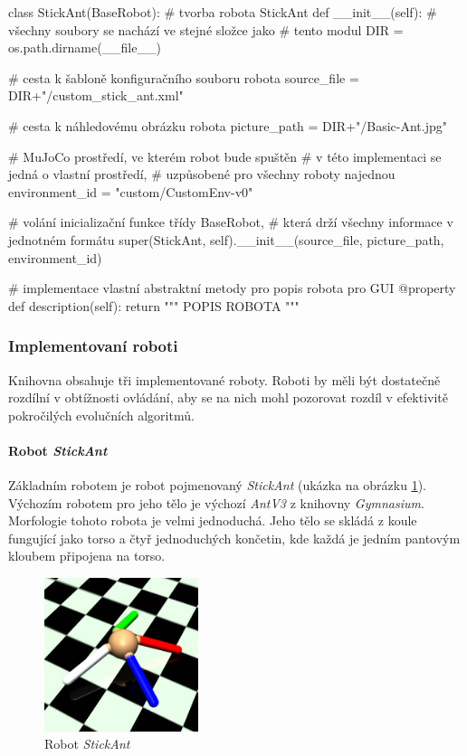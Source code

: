 \begin{code}
class StickAnt(BaseRobot): # tvorba robota StickAnt
    def __init__(self):
        # všechny soubory se nachází ve stejné složce jako 
        # tento modul
        DIR = os.path.dirname(__file__)

        # cesta k šabloně konfiguračního souboru robota
        source_file = DIR+"/custom_stick_ant.xml"

        # cesta k náhledovému obrázku robota
        picture_path = DIR+"/Basic-Ant.jpg"

        # MuJoCo prostředí, ve kterém robot bude spuštěn
        # v této implementaci se jedná o vlastní prostředí,
        # uzpůsobené pro všechny roboty najednou
        environment_id = "custom/CustomEnv-v0"

        # volání inicializační funkce třídy BaseRobot,
        # která drží všechny informace v jednotném formátu
        super(StickAnt, self).__init__(source_file, 
                                       picture_path, 
                                       environment_id)

    # implementace vlastní abstraktní metody pro popis robota pro GUI
    @property
    def description(self):
        return """ POPIS ROBOTA """
\end{code}

\subsubsection{Implementovaní roboti}
Knihovna obsahuje tři implementované roboty. Roboti by měli být dostatečně
rozdílní v obtížnosti ovládání, aby se na nich mohl pozorovat rozdíl v
efektivitě pokročilých evolučních algoritmů.

\paragraph{Robot \emph{StickAnt}} \label{imp:robots.StickAnt}
Základním robotem je robot pojmenovaný \emph{StickAnt} (ukázka na obrázku
\ref{imp:fig:robots.StickAnt}). Výchozím robotem pro jeho tělo je výchozí
\emph{AntV3} z knihovny \emph{Gymnasium}. Morfologie tohoto robota je velmi
jednoduchá. Jeho tělo se skládá z koule fungující jako torso a čtyř
jednoduchých končetin, kde každá je jedním pantovým kloubem připojena na torso.
\begin{figure}[!htb]
    \centering
    \includegraphics[width=0.4\textwidth]{../img/crop_Basic-Ant.jpg}
    \caption{Robot \emph{StickAnt}}
    \label{imp:fig:robots.StickAnt}
\end{figure}


